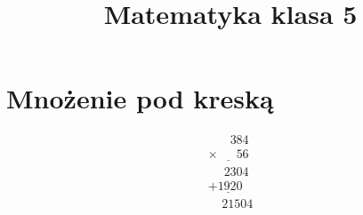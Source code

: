 \documentclass[11pt]{article}
\title{Matematyka klasa 5}
\theoremstyle{definition}
\begin{document}
\maketitle

\section{Mnożenie pod kreską}

\begin{equation*}\begin{array}{c}
\phantom{\times00}384\\
\underline{\times\phantom{000}56}\\
\phantom{\times0}2304\\
\underline{+1920\phantom9}\\
\phantom\times21504
\end{array}\end{equation*}




\end{document}
